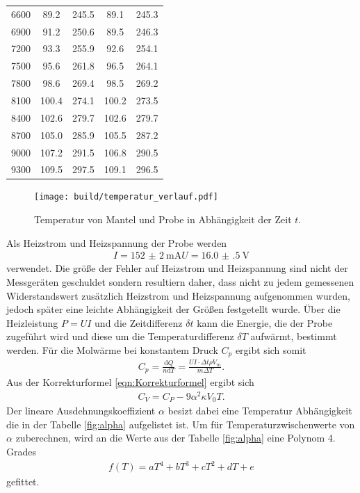 \begin{table}
\begin{tabular}{c c c c c}
  6600	&	89.2	&	245.5	&	89.1	&	245.3   \\
  6900	&	91.2	&	250.6	&	89.5	&	246.3   \\
  7200	&	93.3	&	255.9	&	92.6	&	254.1   \\
  7500	&	95.6	&	261.8	&	96.5	&	264.1   \\
  7800	&	98.6	&	269.4	&	98.5	&	269.2   \\
  8100	&	100.4	&	274.1	&	100.2	&	273.5   \\
  8400	&	102.6	&	279.7	&	102.6	&	279.7   \\
  8700	&	105.0	&	285.9	&	105.5	&	287.2   \\
  9000	&	107.2	&	291.5	&	106.8	&	290.5   \\
  9300	&	109.5	&	297.5	&	109.1	&	296.5   \\
  \bottomrule
\end{tabular}
\end{table}

\begin{figure}
  \centering
  \texttt{[image: build/temperatur\_verlauf.pdf]}
  \caption{Temperatur von Mantel und Probe in Abhängigkeit der Zeit $t$.}
  \label{fig:T_mess}
\end{figure}


Als Heizstrom und Heizspannung der Probe
werden
\begin{align}
  I = \SI{152(2)}{\milli\ampere}
  U = \SI{16.0(5)}{\volt}
\end{align}
verwendet. Die größe
der Fehler auf Heizstrom und Heizspannung
sind nicht der Messgeräten geschuldet
sondern resultiern daher, dass nicht
zu jedem gemessenen Widerstandswert
zusätzlich Heizstrom und Heizspannung
aufgenommen wurden, jedoch später
eine leichte Abhängigkeit
der Größen festgetellt wurde.
Über die Heizleistung $P=UI$
und die Zeitdifferenz $\delta t$
kann die Energie, die der Probe zugeführt wird
und diese um die Temperaturdifferenz
$\delta T$ aufwärmt, bestimmt werden.
Für die Molwärme bei konstantem
Druck $C_p$ ergibt sich somit
\begin{align}
  C_p =\frac{\text{d} Q}{n \text{d} T }  = \frac{UI \cdot \Delta t \rho V_m }{m \Delta T}. \label{eqn:C_p}
\end{align}
Aus der Korrekturformel \eqref{eqn:Korrekturformel} ergibt sich
\begin{align}
C_V = C_P- 9\alpha^2 \kappa V_0 T \label{eqn:C_V}.
\end{align}
Der lineare Ausdehnungskoeffizient $\alpha$ besizt dabei
eine Temperatur Abhängigkeit die in der Tabelle \ref{fig:alpha}
aufgelistet ist. Um für Temperaturzwischenwerte von $\alpha$
zuberechnen, wird an die Werte aus der Tabelle \ref{fig:alpha}
eine Polynom 4. Grades
\begin{align}
f(T) = a T^4 + b  T^3 + c  T^2 + d T + e
\end{align}
gefittet.

